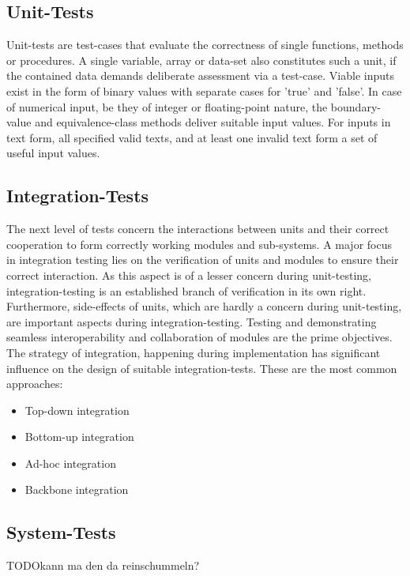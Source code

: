 \documentclass[master,english,smartquotes,apa]{hgbthesis}
\begin{document}
			\subsection{Unit-Tests}
			Unit-tests are test-cases that evaluate the correctness of single functions, methods or procedures. A single variable, array or data-set also constitutes such a unit, if the contained data demands deliberate assessment via a test-case. Viable inputs exist in the form of binary values with separate cases for 'true' and 'false'. In case of numerical input, be they of integer or floating-point nature, the boundary-value and equivalence-class methods deliver suitable input values. For inputs in text form, all specified valid texts, and at least one invalid text form a set of useful input values. \cite{jorgensen13}
			\subsection{Integration-Tests}
			The next level of tests concern the interactions between units and their correct cooperation to form correctly working modules and sub-systems. A major focus in integration testing lies on the verification of units and modules to ensure their correct interaction. As this aspect is of a lesser concern during unit-testing, integration-testing is an established branch of verification in its own right. Furthermore, side-effects of units, which are hardly a concern during unit-testing, are important aspects during integration-testing. Testing and demonstrating seamless interoperability and collaboration of modules are the prime objectives. \cite{SpilSoft2005} %
			The strategy of integration, happening during implementation has significant influence on the design of suitable integration-tests. These are the most common approaches:
			\begin{itemize} \setlength\itemsep{1px}
			\item Top-down integration 
			\item Bottom-up integration 
			\item Ad-hoc integration 
			\item Backbone integration 
			\end{itemize} 
			
			\subsection{System-Tests}
			TODO{kann ma den da reinschummeln?}
			\cite{Beizer95}
\end{document}
